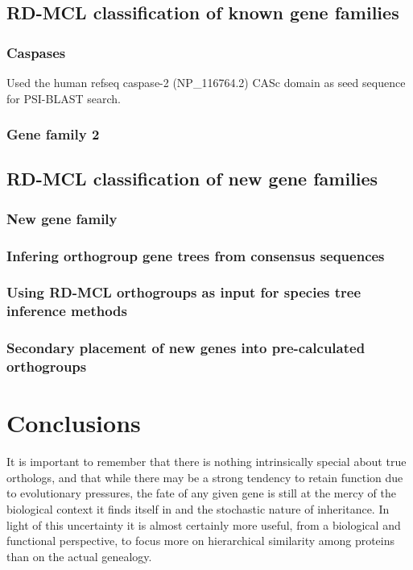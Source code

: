 \documentclass[twocolumn]{bmcart}%
\begin{document}
\subsection{RD-MCL classification of known gene families}\label{subsec:rd-mclClassificationOfKnownGeneFamilies}
\lipsum[1]

\subsubsection{Caspases}
Used the human refseq caspase-2 (NP\_116764.2) CASc domain as seed sequence for PSI-BLAST search.

\subsubsection{Gene family 2}
\lipsum[1]

\subsection{RD-MCL classification of new gene families}\label{subsec:rd-mclClassificationOfNewGeneFamilies}
\lipsum[1]

\subsubsection{New gene family}
\lipsum[2]

\subsubsection{Infering orthogroup gene trees from consensus sequences}
\lipsum[1]

\subsubsection{Using RD-MCL orthogroups as input for species tree inference methods}
\lipsum[1]

\subsubsection{Secondary placement of new genes into pre-calculated orthogroups}
\lipsum[1]

\section{Conclusions}\label{sec:conclusions}
It is important to remember that there is nothing intrinsically special about true orthologs, and that while there may be a strong tendency to retain function due to evolutionary pressures, the fate of any given gene is still at the mercy of the biological context it finds itself in and the stochastic nature of inheritance.
In light of this uncertainty it is almost certainly more useful, from a biological and functional perspective, to focus more on hierarchical similarity among proteins than on the actual genealogy.
\end{document}
